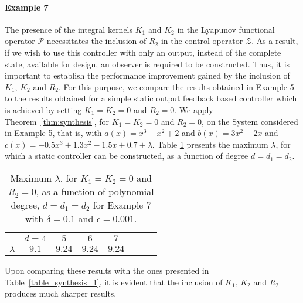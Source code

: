 \documentclass[9pt,journal,twocolumn]{IEEEtran}
\begin{document}
\paragraph*{Example 7} The presence of the integral kernels $K_1$ and $K_2$ in the Lyapunov functional operator $\mathcal{P}$ necessitates the inclusion of $R_2$ in the control operator $\mathcal{Z}$. As a result, if we wish to use this controller with only an output, instead of the complete state, available for design, an observer is required to be constructed. Thus, it is important to establish the performance improvement gained by the inclusion of $K_1$, $K_2$ and $R_2$. For this purpose, we compare the results obtained in Example 5 to the results obtained for a simple static output feedback based controller which is achieved by setting $K_1=K_2=0$ and $R_2=0$. We apply Theorem~\ref{thm:synthesis}, for $K_1=K_2=0$ and $R_2=0$, on the System considered in Example 5, that is, with $a(x)=x^3-x^2+2$ and $b(x)=3x^2-2x$ and $c(x)= -0.5x^3 + 1.3x^2 - 1.5x + 0.7+\lambda$. Table \ref{table_synthesis_3} presents the maximum  $\lambda$, for which a static controller can be constructed, as a function of degree $d=d_1=d_2$.
\begin{table}[h]
\begin{center}
    \begin{tabular}{l *{7}{c}}\hline \hline
  & $d=4$ & $5$ & $6$ & $7$ \\ \hline
$\lambda$ &  $9.1$ & $9.24$ & $9.24$ & $9.24$ \\
\end{tabular}
\end{center}
\caption{Maximum $\lambda$, for $K_1=K_2=0$ and $R_2=0$, as a function of polynomial degree, $d=d_1=d_2$ for Example 7 with $\delta=0.1$ and $\epsilon=0.001$.}
\label{table_synthesis_3}
\end{table} Upon comparing these results with the ones presented in Table~\ref{table_synthesis_1}, it is evident that the inclusion of $K_1$, $K_2$ and $R_2$ produces much sharper results.
\end{document}
